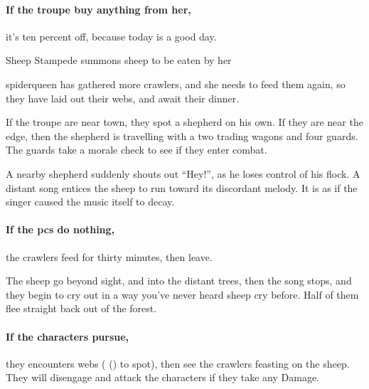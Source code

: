 \paragraph{If the troupe buy anything from her,}
it's ten percent off, because today is a good day.

{Sheep Stampede}%
{ summons sheep to be eaten by her }%

\begin{exampletext}
  \Gls{spiderqueen} has gathered more \glspl{crawler}, and she needs to feed them again, so they have laid out their webs, and await their dinner.
\end{exampletext}

If the troupe are near town, they spot a shepherd on his own.
If they are near the \gls{edge}, then the shepherd is travelling with a two trading wagons and four \glspl{guard}. 
The \glspl{guard} take a morale check to see if they enter combat.%



\begin{boxtext}
  A nearby shepherd suddenly shouts out ``Hey!'', as he loses control of his flock.
  A distant song entices the sheep to run toward its discordant melody. It is as if the singer caused the music itself to decay.
\end{boxtext}

\paragraph{If the \glspl{pc} do nothing,}
the \glspl{crawler} feed for thirty minutes, then leave.

\begin{boxtext}
  The sheep go beyond sight, and into the distant trees, then the song stops, and they begin to cry out in a way you've never heard sheep cry before.  Half of them flee straight back out of the forest.
\end{boxtext}

\paragraph{If the characters pursue,}
they encounters webs ( (\tn[9]) to spot), then see the \glspl{crawler} feasting on the sheep.
They will disengage and attack the characters if they take any Damage.

